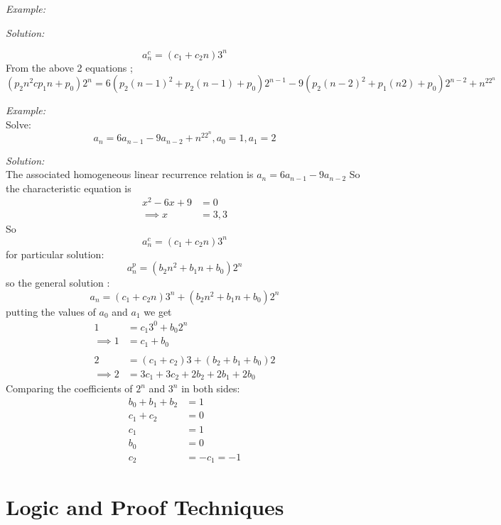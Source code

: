 \documentclass[11pt,letterpaper]{article}
\newenvironment{solution}                      
        {\begin{mdframed}\textit{Solution:} \\}
        {\end{mdframed}}
\newenvironment{example}                             
        {\noindent\textit{Example:}\\}
	{}
\begin{document}
\begin{example}
\begin{solution}
\begin{enumerate}
        \[
          a_n^c = (c_1 + c_2n) 3^n
        \]
        From the above 2 equations ; 
        \begin{equation*}
          (p_2 n^2 c p_1n + p_0) 2^n = 6(p_2(n-1)^2 + p_2(n-1) +p_0) 2^{n-1} - 9 (p_2(n-2)^2 + p_1(n2)+p_0)2^{n-2} + n^22^n 
        \end{equation*}
    \end{enumerate}
  \end{solution}
  \begin{example}
    Solve:
    \[
      a_n = 6a_{n-1}- 9 a_{n-2} + n^22^n , a_0 = 1, a_1 = 2
    \]
    \begin{solution}
      The associated homogeneous linear recurrence relation is $a_n = 6a_{n-1} - 9a_{n-2}$
      So the characteristic equation is
      \begin{align*}
        x^2 - 6x + 9 &= 0 \\         
        \implies x &= 3,3
      \end{align*}
      So 
      \[
        a_n^c = (c_1 + c_2n) 3^n
      \]
      for particular solution: 
      \[
        a_n^p = (b_2 n^2 + b_1 n + b_0) 2^n
      \]
      so the general solution :
      \[
        a_n = (c_1 + c_2n)3^n + (b_2 n^2 + b_1 n + b_0) 2^n
      \]
      putting the values of $a_0$ and $a_1$ we get 
      \begin{align*}
        1 &= c_1 3^0 + b_0 2^n \\ 
        \implies 1 &= c_1 + b_0\\ \\ 
        2 &= (c_1 + c_2) 3 + (b_2+ b_1 + b_0)2\\
        \implies 2 &= 3c_1 + 3c_2 + 2b_2 + 2b_1 + 2b_0
      \end{align*}
      Comparing the coefficients of $2^n$ and $3^n$ in both sides: 
      \begin{align*}
        b_0 + b_1 + b_2 &= 1\\ 
        c_1 + c_2 &= 0\\ 
        c_1 &= 1\\ 
        b_0 &= 0\\ 
        c_2 &= -c_1 = -1
      \end{align*}
    \end{solution}
  \end{example}
\end{example}

\section{Logic and Proof Techniques}
\end{document}
